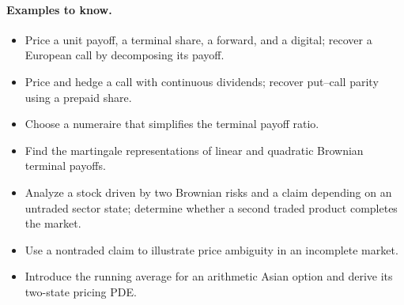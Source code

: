 \paragraph{Examples to know.}
\begin{itemize}[leftmargin=1.5em,itemsep=0.15em]
  \item Price a unit payoff, a terminal share, a forward, and a digital;
        recover a European call by decomposing its payoff.
  \item Price and hedge a call with continuous dividends; recover
        put--call parity using a prepaid share.
  \item Choose a numeraire that simplifies the terminal payoff ratio.
  \item Find the martingale representations of linear and quadratic
        Brownian terminal payoffs.
  \item Analyze a stock driven by two Brownian risks and a claim depending
        on an untraded sector state; determine whether a second traded
        product completes the market.
  \item Use a nontraded claim to illustrate price ambiguity in an
        incomplete market.
  \item Introduce the running average for an arithmetic Asian option
        and derive its two-state pricing PDE.
\end{itemize}
